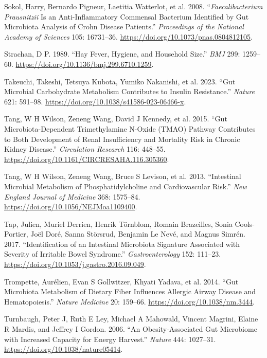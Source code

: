 \documentclass[
  11pt,
]{article}
\newlength{\cslhangindent}
\newenvironment{CSLReferences}[2] %
 {\begin{list}{}{%
  \setlength{\itemindent}{0pt}
  \setlength{\leftmargin}{0pt}
  \setlength{\parsep}{0pt}
  \ifodd #1
   \setlength{\leftmargin}{\cslhangindent}
   \setlength{\itemindent}{-1\cslhangindent}
  \fi
  \setlength{\itemsep}{#2\baselineskip}}}
 {\end{list}}
\begin{document}
\begin{CSLReferences}{1}{0}
Sokol, Harry, Bernardo Pigneur, Laetitia Watterlot, et al. 2008.
{``\emph{{F}aecalibacterium Prausnitzii} Is an Anti-Inflammatory
Commensal Bacterium Identified by Gut Microbiota Analysis of {C}rohn
Disease Patients.''} \emph{Proceedings of the National Academy of
Sciences} 105: 16731--36. \url{https://doi.org/10.1073/pnas.0804812105}.

Strachan, D P. 1989. {``Hay Fever, Hygiene, and Household Size.''}
\emph{BMJ} 299: 1259--60.
\url{https://doi.org/10.1136/bmj.299.6710.1259}.

Takeuchi, Takeshi, Tetsuya Kubota, Yumiko Nakanishi, et al. 2023. {``Gut
Microbial Carbohydrate Metabolism Contributes to Insulin Resistance.''}
\emph{Nature} 621: 591--98.
\url{https://doi.org/10.1038/s41586-023-06466-x}.

Tang, W H Wilson, Zeneng Wang, David J Kennedy, et al. 2015. {``Gut
Microbiota-Dependent Trimethylamine {N}-Oxide ({TMAO}) Pathway
Contributes to Both Development of Renal Insufficiency and Mortality
Risk in Chronic Kidney Disease.''} \emph{Circulation Research} 116:
448--55. \url{https://doi.org/10.1161/CIRCRESAHA.116.305360}.

Tang, W H Wilson, Zeneng Wang, Bruce S Levison, et al. 2013.
{``Intestinal Microbial Metabolism of Phosphatidylcholine and
Cardiovascular Risk.''} \emph{New England Journal of Medicine} 368:
1575--84. \url{https://doi.org/10.1056/NEJMoa1109400}.

Tap, Julien, Muriel Derrien, Henrik Törnblom, Romain Brazeilles, Sonia
Cools-Portier, Joël Doré, Sanna Störsrud, Benjamin Le Nevé, and Magnus
Simrén. 2017. {``Identification of an Intestinal Microbiota Signature
Associated with Severity of Irritable Bowel Syndrome.''}
\emph{Gastroenterology} 152: 111--23.
\url{https://doi.org/10.1053/j.gastro.2016.09.049}.

Trompette, Aurélien, Evan S Gollwitzer, Khyati Yadava, et al. 2014.
{``Gut Microbiota Metabolism of Dietary Fiber Influences Allergic Airway
Disease and Hematopoiesis.''} \emph{Nature Medicine} 20: 159--66.
\url{https://doi.org/10.1038/nm.3444}.

Turnbaugh, Peter J, Ruth E Ley, Michael A Mahowald, Vincent Magrini,
Elaine R Mardis, and Jeffrey I Gordon. 2006. {``An Obesity-Associated
Gut Microbiome with Increased Capacity for Energy Harvest.''}
\emph{Nature} 444: 1027--31. \url{https://doi.org/10.1038/nature05414}.


\end{CSLReferences}
\end{document}
